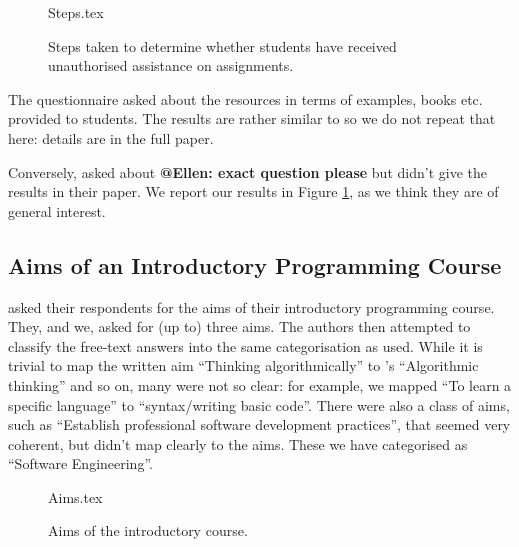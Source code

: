 \documentclass{sig-alternate}
\begin{document}
\begin{figure}
\begin{center}
{Steps.tex}
\end{center}\vskip-18pt
\caption{Steps taken to determine whether students have received unauthorised assistance on assignments.\label{fig:Plagiarise}}
\end{figure}

The questionnaire asked about the resources in terms of examples,
books etc. provided to students. The results are rather similar to
\cite[Figure 14]{mason+cooper:2014} so we do not repeat that here:
details are in the full paper.

Conversely, \cite{mason+cooper:2014} asked about {\bf @Ellen: exact
  question please} but didn't give the results  in their paper. We
report our results in Figure \ref{fig:Plagiarise}, as we think they
are of general interest. 


\subsection{Aims of an Introductory Programming Course}

 \cite{mason+cooper:2014} asked their respondents for the aims of
their introductory programming course. They, and we, asked for (up to)
three aims. The authors then attempted to classify the free-text
answers into the same categorisation as \cite{mason+cooper:2014}
used. While it is trivial to map the written aim ``Thinking
algorithmically'' to \cite{mason+cooper:2014}'s ``Algorithmic
thinking'' and so on, many were not so clear: for example, we mapped
``To learn a specific language'' to ``syntax/writing basic
code''. There were also a class of aims, such as ``Establish
professional software development practices'', that seemed very
coherent, but didn't map clearly to the \cite{mason+cooper:2014}
aims. These we have categorised as ``Software Engineering''.

\begin{figure}
\begin{center}
{Aims.tex}
\end{center}\vskip-18pt
\caption{Aims of the introductory course. \label{fig:aims}}
\end{figure}
\end{document}
